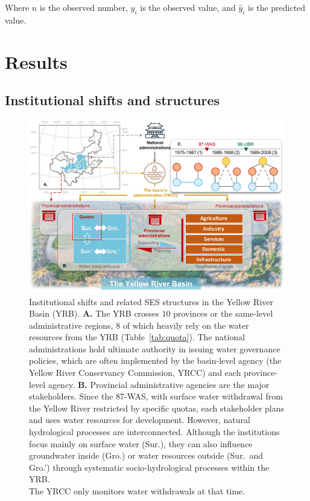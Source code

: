 \documentclass[preprint, 12pt]{elsarticle}
\begin{document}
Where $n$ is the observed number, $y_i$ is the observed value, and $\hat{y}_i$ is the predicted value.

\section{Results}\label{sec:results}


\subsection{Institutional shifts and structures}\label{results-1}

\begin{figure}[!t]
	\includegraphics[width=\linewidth]{diagrams/diagram.pdf}
	\caption{
Institutional shifts and related SES structures in the Yellow River Basin (YRB).
		\textbf{A.} The YRB crosses $10$ provinces or the same-level administrative regions, $8$ of which heavily rely on the water resources from the YRB (Table~\ref{tab:quota}). The national administrations hold ultimate authority in issuing water governance policies, which are often implemented by the basin-level agency (the Yellow River Conservancy Commission, YRCC) and each province-level agency.
		\textbf{B.} Provincial administrative agencies are the major stakeholders. Since the 87-WAS, with surface water withdrawal from the Yellow River restricted by specific quotas, each stakeholder plans and uses water resources for development. However, natural hydrological processes are interconnected. Although the institutions focus mainly on surface water (Sur.), they can also influence groundwater inside (Gro.) or water resources outside (Sur.\ and Gro.') through systematic socio-hydrological processes within the YRB.\\ The YRCC only monitors water withdrawals at that time.
}
\end{figure}
\end{document}
